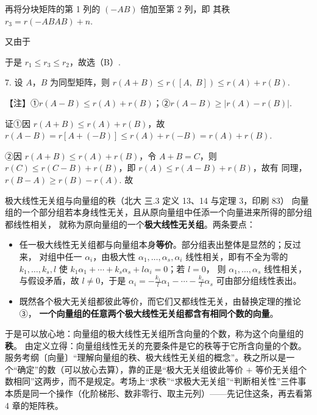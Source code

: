 再将分块矩阵的第 1 列的 $(-AB)$ 倍加至第 2 列，即
其秩 $r_3=r(-ABAB)+n$.

又由于

于是 $r_1\le r_3\le r_2$，故选（B）.

7. 设 $A$，$B$ 为同型矩阵，则 $r(A+B)\le r([A,\;B])\le r(A)+r(B)$.

\begin{fnote}
【注】①$r(A-B)\le r(A)+r(B)$；②$r(A-B)\ge|r(A)-r(B)|$.

证\quad①因 $r(A+B)\le r(A)+r(B)$，故 $r(A-B)=r[A+(-B)]\le r(A)+r(-B)=r(A)+r(B)$.

②因 $r(A+B)\le r(A)+r(B)$，令 $A+B=C$，则 $r(C)\le r(C-B)+r(B)$，即 $r(A)\le r(A-B)+r(B)$，故有
同理，$r(B-A)\ge r(B)-r(A)$. 故
\end{fnote}


\begin{fdeep}{极大线性无关组与向量组的秩（北大 三.3 定义 13、14 与定理 3，印刷 83）}
向量组的一个部分组若本身线性无关，且从原向量组中任添一个向量进来所得的部分组都线性相关，
就称为原向量组的一个\textbf{极大线性无关组}。两条要点：
\begin{itemize}[leftmargin=2.2em,itemsep=0.22em]
\item 任一极大线性无关组都与向量组本身\textbf{等价}。部分组表出整体是显然的；反过来，
      对组中任一 $\alpha_i$，由极大性 $\alpha_1,\dots,\alpha_s,\alpha_i$ 线性相关，即有不全为零的
      $k_1,\dots,k_s,l$ 使 $k_1\alpha_1+\cdots+k_s\alpha_s+l\alpha_i=0$；若 $l=0$，
      则 $\alpha_1,\dots,\alpha_s$ 线性相关，与假设矛盾，故 $l\ne0$，于是
      $\alpha_i=-\frac{k_1}{l}\alpha_1-\cdots-\frac{k_s}{l}\alpha_s$ 可由部分组线性表出。
\item 既然各个极大无关组都彼此等价，而它们又都线性无关，由替换定理的推论 ③，
      \textbf{一个向量组的任意两个极大线性无关组都含有相同个数的向量}。
\end{itemize}
于是可以放心地：向量组的极大线性无关组所含向量的个数，称为这个向量组的\textbf{秩}。
由定义立得：向量组线性无关的充要条件是它的秩等于它所含向量的个数。
\fbref{}服务考纲〔向量〕“理解向量组的秩、极大线性无关组的概念”。秩之所以是一个“确定”的数（可以放心去算），靠的正是“极大无关组彼此等价 $+$ 等价无关组个数相同”这两步，而不是规定。考场上“求秩”“求极大无关组”“判断相关性”三件事本质是同一个操作（化阶梯形、数非零行、取主元列）——先记住这条，再去看第 4 章的矩阵秩。
\end{fdeep}

